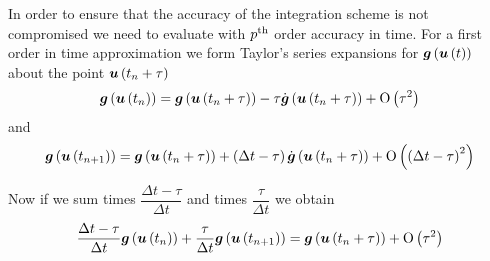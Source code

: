 In order to ensure that the accuracy of the integration scheme is not
compromised we need to evaluate  with
${p}^{\text{th}}$ order accuracy in time. For a first order in time approximation we form Taylor's series expansions for
$ \boldsymbol{g}\left(  \boldsymbol{u}\left( t \right)  \right) $ about the point
$ \boldsymbol{u}\left( t_{n}+\tau \right) $ \ie
\begin{equation}
  \fnof{\vectr{g}}{\fnof{\vectr{u}}{t_{n}}}=\fnof{\vectr{g}}{\fnof{\vectr{u}}{t_{n}+\tau}}-
  \tau\fnof{\dot{\vectr{g}}}{\fnof{\vectr{u}}{t_{n}+\tau}}+\orderof{\tau^{2}}
  \label{eqn:firstordercurrentTaylorexpansion}
\end{equation}
and
\begin{equation}
  \fnof{\vectr{g}}{\fnof{\vectr{u}}{t_{n+1}}}=\fnof{\vectr{g}}{\fnof{\vectr{u}}{t_{n}+\tau}}+
  \pbrac{\Delta
    t-\tau}\fnof{\dot{\vectr{g}}}{\fnof{\vectr{u}}{t_{n}+\tau}}+\orderof{\pbrac{\Delta
      t-\tau}^{2}}
  \label{eqn:firstordernextTaylorexpansion}
\end{equation}

Now if we sum  times
$\dfrac{\Delta t -\tau}{\Delta t}$ and
 times 
$\dfrac{\tau}{\Delta t}$ we obtain
\begin{equation}
  \dfrac{\Delta t-\tau}{\Delta t} \boldsymbol{g}\left(  \boldsymbol{u}\left( t_{n} \right)  \right) +
  \dfrac{\tau}{\Delta t} \boldsymbol{g}\left(  \boldsymbol{u}\left( t_{n+1} \right)  \right) =
   \boldsymbol{g}\left(  \boldsymbol{u}\left( t_{n}+\tau \right)  \right) + \mathrm{O}\left( \tau^{2} \right) 
\end{equation}

